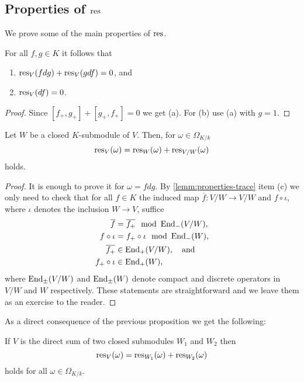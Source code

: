 \subsection*{Properties of $\operatorname{res}$}
We prove some of the main properties of $\operatorname{res}$.
\begin{proposition}\label{prop:linearity-residue}
	For all $f,g \in K$ it follows that
	\begin{enumerate}[label = (\alph*)]
		\item $\operatorname{res}_{V}(fdg) + \operatorname{res}_{V}(gdf) = 0$, and
		\item $\operatorname{res}_V(df) = 0$.
	\end{enumerate}
\end{proposition}
\begin{proof}
	Since $[f_{+}, g_{+}] + [g_{+}, f_{+}] = 0$ we get (a). For (b) use (a) with $g = 1$. 
\end{proof}
\begin{proposition}\label{prop:linearity-residue-closed-submodule}
	Let $W$ be a closed $K$-submodule of $V$. Then, for $\omega \in \Omega_{K/k}$
	\[
		\operatorname{res}_{V}(\omega) = \operatorname{res}_{W}(\omega) + \operatorname{res}_{V/W}(\omega)
	\]
	holds.
\end{proposition}
\begin{proof}
	It is enough to prove it for $\omega = f dg$. By \cref{lemm:properties-trace} item (c) we only need to check that for all $f \in K$ the induced map $\overline{f}\colon V/W \to V/W$ and $f \circ \iota$, where $\iota$ denotes the inclusion $W \to V$, suffice 
	\begin{align*}
	\overline{f} &= \overline{f_{+}} \mod {\operatorname{End}}_{-}(V/W), \\
	f \circ \iota &= f_{+} \circ \iota \mod {\operatorname{End}}_{-}(W), \\ 
	\overline{f_{+}}&\in \operatorname{End}_{+}(V/W), \quad\text{and} \\
	f_{+} \circ \iota &\in \operatorname{End}_{+}(W),
	\end{align*}
	where $\operatorname{End}_{\pm}(V/W)$ and $\operatorname{End}_{\pm}(W)$ denote compact and discrete operators in $V/W$ and $W$ respectively. These statements are straightforward and we leave them as an exercise to the reader.
\end{proof}
As a direct consequence of the previous proposition we get the following:
\begin{proposition}\label{prop:direct-sum-residue}
	If $V$ is the direct sum of two closed submodules $W_{1}$ and $W_{2}$ then 
	\[
		\operatorname{res}_{V}(\omega) = \operatorname{res}_{W_{1}}(\omega) + \operatorname{res}_{W_{2}}(\omega)
	\]
	holds for all $\omega \in \Omega_{K/k}$.
\end{proposition}
